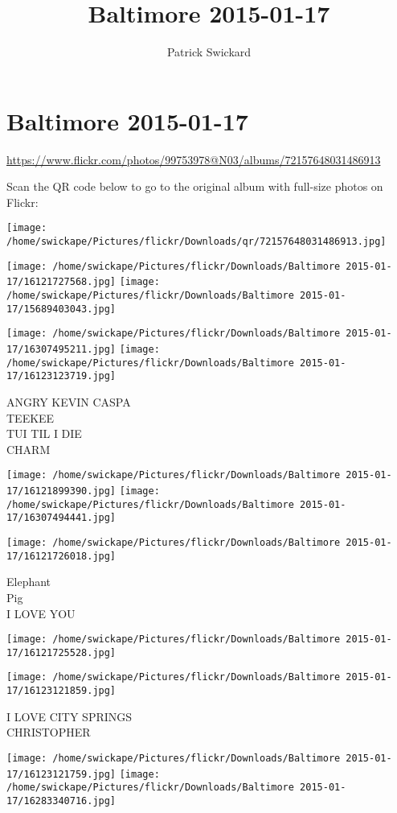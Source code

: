 \documentclass[10pt,letterpaper]{article}
\title{Baltimore 2015-01-17}
\author{Patrick Swickard}
\date{}
\begin{document}
\section*{Baltimore 2015-01-17}

\url{https://www.flickr.com/photos/99753978@N03/albums/72157648031486913}

Scan the QR code below to go to the original album with full-size photos on Flickr:

\texttt{[image: /home/swickape/Pictures/flickr/Downloads/qr/72157648031486913.jpg]}
\pagebreak

\texttt{[image: /home/swickape/Pictures/flickr/Downloads/Baltimore 2015-01-17/16121727568.jpg]}
\texttt{[image: /home/swickape/Pictures/flickr/Downloads/Baltimore 2015-01-17/15689403043.jpg]}

\texttt{[image: /home/swickape/Pictures/flickr/Downloads/Baltimore 2015-01-17/16307495211.jpg]}
\texttt{[image: /home/swickape/Pictures/flickr/Downloads/Baltimore 2015-01-17/16123123719.jpg]}

ANGRY KEVIN CASPA\\
TEEKEE\\
TUI TIL I DIE\\
CHARM
\pagebreak

\texttt{[image: /home/swickape/Pictures/flickr/Downloads/Baltimore 2015-01-17/16121899390.jpg]}
\texttt{[image: /home/swickape/Pictures/flickr/Downloads/Baltimore 2015-01-17/16307494441.jpg]}

\texttt{[image: /home/swickape/Pictures/flickr/Downloads/Baltimore 2015-01-17/16121726018.jpg]}

Elephant\\
Pig\\
I LOVE YOU
\pagebreak

\texttt{[image: /home/swickape/Pictures/flickr/Downloads/Baltimore 2015-01-17/16121725528.jpg]}

\vspace{0.25in}
\texttt{[image: /home/swickape/Pictures/flickr/Downloads/Baltimore 2015-01-17/16123121859.jpg]}

I LOVE CITY SPRINGS\\
CHRISTOPHER
\pagebreak

\texttt{[image: /home/swickape/Pictures/flickr/Downloads/Baltimore 2015-01-17/16123121759.jpg]}
\texttt{[image: /home/swickape/Pictures/flickr/Downloads/Baltimore 2015-01-17/16283340716.jpg]}
\end{document}
